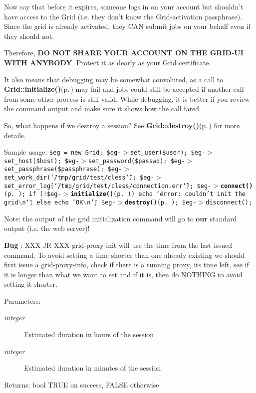 Now say that before it expires, someone logs in on your account but shouldn't have access to the Grid (i.e. they don't know the Grid-activation passphrase). Since the grid is already activated, they CAN submit jobs on your behalf even if they should not.

Therefore, {\bf DO NOT SHARE YOUR ACCOUNT ON THE GRID-UI WITH ANYBODY}. Protect it as dearly as your Grid certificate.

It also means that debugging may be somewhat convoluted, as a call to {\bf Grid::initialize()}{\rm (p.\,\pageref{classGrid_a11})} may fail and jobs could still be accepted if another call from some other process is still valid. While debugging, it is better if you review the command output and make sure it shows how the call fared.

So, what happens if we destroy a session? See {\bf Grid::destroy()}{\rm (p.\,\pageref{classGrid_a12})} for more details.

Sample usage: {\tt  \$eg = new Grid; \$eg-$>$set\_\-user(\$user); \$eg-$>$set\_\-host(\$host); \$eg-$>$set\_\-password(\$passwd); \$eg-$>$set\_\-passphrase(\$passphrase); \$eg-$>$set\_\-work\_\-dir(\char`\"{}/tmp/grid/test/cless\char`\"{}); \$eg-$>$set\_\-error\_\-log(\char`\"{}/tmp/grid/test/cless/connection.err\char`\"{}); \$eg-$>${\bf connect()}{\rm (p.\,\pageref{classGrid_a10})}; if (!\$eg-$>${\bf initialize()}{\rm (p.\,\pageref{classGrid_a11})}) echo \char`\"{}error: couldn't init the grid$\backslash$n\char`\"{}; else echo \char`\"{}OK$\backslash$n\char`\"{}; \$eg-$>${\bf destroy()}{\rm (p.\,\pageref{classGrid_a12})}; \$eg-$>$disconnect(); }

\begin{Desc}
\item[Note:]the output of the grid initialization command will go to {\bf our} standard output (i.e. the web server)!\end{Desc}


\begin{Desc}
\item[{\bf Bug}]: XXX JR XXX grid-proxy-init will use the time from the last issued command. To avoid setting a time shorter than one already existing we should first issue a grid-proxy-info, check if there is a running proxy, its time left, see if it is longer than what we want to set and if it is, then do NOTHING to avoid setting it shorter. \end{Desc}
\begin{Desc}
\item[Parameters:]
\begin{description}
\item[{\em integer}]Estimated duration in hours of the session\item[{\em integer}]Estimated duration in minutes of the session\end{description}
\end{Desc}
\begin{Desc}
\item[Returns:]bool TRUE on success, FALSE otherwise \end{Desc}


